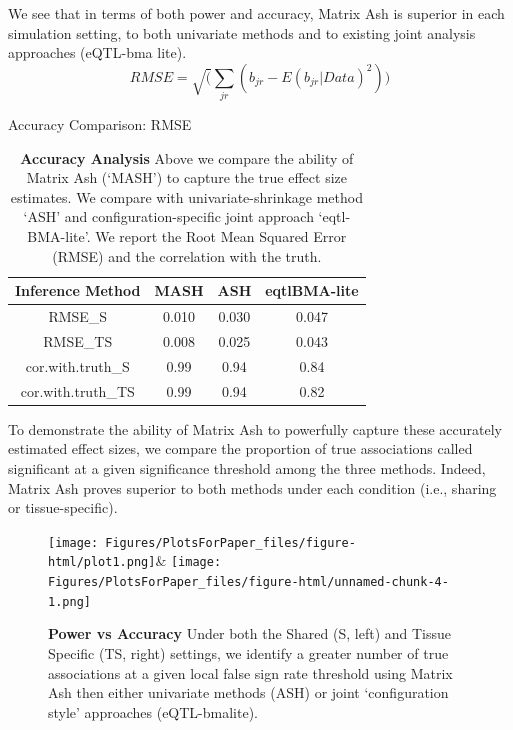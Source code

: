 We see that in terms of both power and accuracy, Matrix Ash is superior in each simulation setting, to both univariate methods and to existing joint analysis approaches (eQTL-bma lite).
\begin{equation}
RMSE = \sqrt(\sum_{jr}(b_{jr}-E(b_{jr}|Data)^2))
\end{equation}
\begin{table}[ht]
\caption{Accuracy Comparison: RMSE}
\centering
\begin{tabular}{c c c c}
\hline\hline
Inference Method & MASH & ASH & eqtlBMA-lite \\ [0.5ex] %
\hline
RMSE_{S}&0.010&0.030&0.047\\
RMSE_{TS}&0.008& 0.025&0.043 \\%
cor.with.truth_{S}&0.99&0.94&0.84\\
cor.with.truth_{TS}&0.99&0.94&0.82\\
\hline
\end{tabular}
\label{table:RMSE}
\caption{\textbf{Accuracy Analysis} Above we compare the ability of Matrix Ash (`MASH') to capture the true effect size estimates. We compare with univariate-shrinkage method `ASH' and configuration-specific joint approach `eqtl-BMA-lite'. We report the Root Mean Squared Error (RMSE) and the correlation with the truth.}
\end{table}

To demonstrate the ability of Matrix Ash to powerfully capture these accurately estimated effect sizes, we compare the proportion of true associations called significant at a given significance threshold among the three methods. Indeed, Matrix Ash proves superior to both methods under each condition (i.e., sharing or tissue-specific). \newline


\begin{figure}[h]
\texttt{[image: Figures/PlotsForPaper\_files/figure-html/plot1.png]}&
\texttt{[image: Figures/PlotsForPaper\_files/figure-html/unnamed-chunk-4-1.png]}
\caption{\textbf{Power vs Accuracy} Under both the Shared (S, left) and Tissue Specific (TS, right) settings, we identify a greater number of true associations at a given local false sign rate threshold using Matrix Ash then either univariate methods (ASH) or joint `configuration style' approaches (eQTL-bmalite).}
\label{fig:powervaccuracy}
\end{figure}\newline


